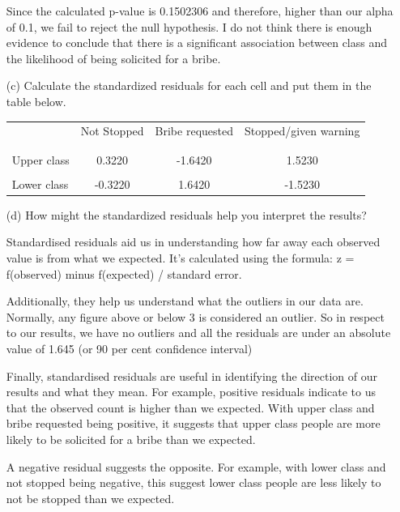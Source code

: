 \documentclass[12pt,letterpaper]{article}
\begin{document}
\begin{enumerate}
	
	Since the calculated p-value is 0.1502306 and therefore, higher than our alpha of 0.1, we fail to reject the null hypothesis. I do not think there is enough evidence to conclude that there is a significant association between class and the likelihood of being solicited for a bribe.
	
	\newpage
	\item [(c)] Calculate the standardized residuals for each cell and put them in the table below.
	\vspace{1cm}
	
	\begin{table}[h]
		\centering
		\begin{tabular}{l | c c c }
			& Not Stopped & Bribe requested & Stopped/given warning \\
			\\[-1.8ex] 
			\hline \\[-1.8ex]
			Upper class & 0.3220 & -1.6420 & 1.5230 \\
			\\
			Lower class & -0.3220 & 1.6420 & -1.5230 \\
			
		\end{tabular}
	\end{table}
	
	
	\vspace{0.5cm}
	\item [(d)] How might the standardized residuals help you interpret the results?  
	
	Standardised residuals aid us in understanding how far away each observed value is from what we expected. It's calculated using the formula: z = f(observed) minus f(expected) / standard error.
	
	Additionally, they help us understand what the outliers in our data are. Normally, any figure above or below 3 is considered an outlier. So in respect to our results, we have no outliers and all the residuals are under an absolute value of 1.645 (or 90 per cent confidence interval)
	
	Finally, standardised residuals are useful in identifying the direction of our results and what they mean. For example, positive residuals indicate to us that the observed count is higher than we expected. With upper class and bribe requested being positive, it suggests that upper class people are more likely to be solicited for a bribe than we expected.
	
	A negative residual suggests the opposite. For example, with lower class and not stopped being negative, this suggest lower class people are less likely to not be stopped than we expected.
	
	
\end{enumerate}
\newpage
\end{document}
